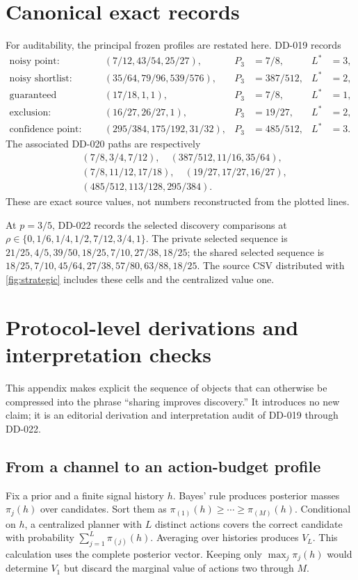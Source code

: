 \documentclass[12pt]{article}
\theoremstyle{definition}
\begin{document}
\section{Canonical exact records}

For auditability, the principal frozen profiles are restated here. DD-019 records
\begin{align*}
\text{noisy point: }&(7/12,43/54,25/27),&P_3&=7/8,&L^*&=3,\\
\text{noisy shortlist: }&(35/64,79/96,539/576),&P_3&=387/512,&L^*&=2,\\
\text{guaranteed shortlist: }&(17/18,1,1),&P_3&=7/8,&L^*&=1,\\
\text{exclusion: }&(16/27,26/27,1),&P_3&=19/27,&L^*&=2,\\
\text{confidence point: }&(295/384,175/192,31/32),&P_3&=485/512,&L^*&=3.
\end{align*}
The associated DD-020 paths are respectively
\begin{align*}
&(7/8,3/4,7/12),\quad (387/512,11/16,35/64),\\
&(7/8,11/12,17/18),\quad (19/27,17/27,16/27),\\
&(485/512,113/128,295/384).
\end{align*}
These are exact source values, not numbers reconstructed from the plotted lines.

At $p=3/5$, DD-022 records the selected discovery comparisons at
$\rho\in\{0,1/6,1/4,1/2,7/12,3/4,1\}$. The private selected sequence is
$21/25,4/5,39/50,18/25,7/10,27/38,18/25$; the shared selected sequence is
$18/25,7/10,45/64,27/38,57/80,63/88,18/25$. The source CSV distributed with
\cref{fig:strategic} includes these cells and the centralized value one.

\section{Protocol-level derivations and interpretation checks}

This appendix makes explicit the sequence of objects that can otherwise be
compressed into the phrase ``sharing improves discovery.'' It introduces no new
claim; it is an editorial derivation and interpretation audit of DD-019 through
DD-022.

\subsection*{From a channel to an action-budget profile}

Fix a prior and a finite signal history $h$. Bayes' rule produces posterior
masses $\pi_j(h)$ over candidates. Sort them as
$\pi_{(1)}(h)\geq\cdots\geq\pi_{(M)}(h)$. Conditional on $h$, a centralized
planner with $L$ distinct actions covers the correct candidate with probability
$\sum_{j=1}^L\pi_{(j)}(h)$. Averaging over histories produces $V_L$. This
calculation uses the complete posterior vector. Keeping only
$\max_j\pi_j(h)$ would determine $V_1$ but discard the marginal value of actions
two through $M$.
\end{document}

